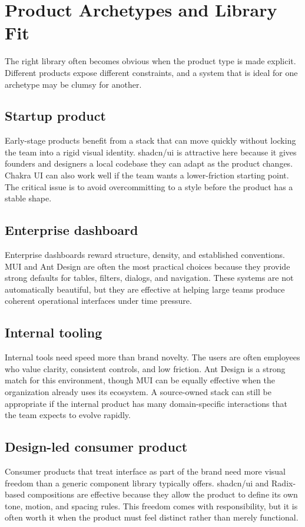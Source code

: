 \documentclass[11pt,twoside,a4paper]{article}
\begin{document}
\section{Product Archetypes and Library Fit}
The right library often becomes obvious when the product type is made explicit. Different products expose different constraints, and a system that is ideal for one archetype may be clumsy for another.

\subsection{Startup product}
Early-stage products benefit from a stack that can move quickly without locking the team into a rigid visual identity. shadcn/ui is attractive here because it gives founders and designers a local codebase they can adapt as the product changes. Chakra UI can also work well if the team wants a lower-friction starting point. The critical issue is to avoid overcommitting to a style before the product has a stable shape.

\subsection{Enterprise dashboard}
Enterprise dashboards reward structure, density, and established conventions. MUI and Ant Design are often the most practical choices because they provide strong defaults for tables, filters, dialogs, and navigation. These systems are not automatically beautiful, but they are effective at helping large teams produce coherent operational interfaces under time pressure.

\subsection{Internal tooling}
Internal tools need speed more than brand novelty. The users are often employees who value clarity, consistent controls, and low friction. Ant Design is a strong match for this environment, though MUI can be equally effective when the organization already uses its ecosystem. A source-owned stack can still be appropriate if the internal product has many domain-specific interactions that the team expects to evolve rapidly.

\subsection{Design-led consumer product}
Consumer products that treat interface as part of the brand need more visual freedom than a generic component library typically offers. shadcn/ui and Radix-based compositions are effective because they allow the product to define its own tone, motion, and spacing rules. This freedom comes with responsibility, but it is often worth it when the product must feel distinct rather than merely functional.
\end{document}
